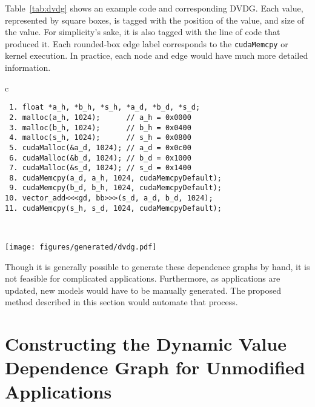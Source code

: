 Table~\ref{tab:dvdg} shows an example code and corresponding DVDG.
Each value, represented by square boxes, is tagged with the position of the value, and size of the value.
For simplicity's sake, it is also tagged with the line of code that produced it.
Each rounded-box edge label corresponds to the \texttt{cudaMemcpy} or kernel execution.
In practice, each node and edge would have much more detailed information.

\begin{table}[ht]
	\centering
    \caption[Dynamic value dependence graph]{
        Example of the dynamic value dependence graph for a simple vector add.
        Allocations in the code are commented with a hypothetical position of the allocation.
        Square blocks represent values, and rounded boxes represent node labels.
    }
    \label{tab:dvdg}
    \begin{tabular}{c}
        \begin{minipage}{\textwidth}
            \begin{lstlisting}
 1. float *a_h, *b_h, *s_h, *a_d, *b_d, *s_d;
 2. malloc(a_h, 1024);      // a_h = 0x0000
 3. malloc(b_h, 1024);      // b_h = 0x0400
 4. malloc(s_h, 1024);      // s_h = 0x0800
 5. cudaMalloc(&a_d, 1024); // a_d = 0x0c00  
 6. cudaMalloc(&b_d, 1024); // b_d = 0x1000
 7. cudaMalloc(&s_d, 1024); // s_d = 0x1400
 8. cudaMemcpy(a_d, a_h, 1024, cudaMemcpyDefault);
 9. cudaMemcpy(b_d, b_h, 1024, cudaMemcpyDefault);
10. vector_add<<<gd, bb>>>(s_d, a_d, b_d, 1024);
11. cudaMemcpy(s_h, s_d, 1024, cudaMemcpyDefault);
            \end{lstlisting}
        \end{minipage}        
    \\
        \begin{minipage}{\textwidth}
            \centering
            \texttt{[image: figures/generated/dvdg.pdf]}

        \end{minipage}

	\end{tabular}
\end{table}

Though it is generally possible to generate these dependence graphs by hand, it is not feasible for complicated applications.
Furthermore, as applications are updated, new models would have to be manually generated.
The proposed method described in this section would automate that process.

\section{Constructing the Dynamic Value Dependence Graph for Unmodified Applications}

